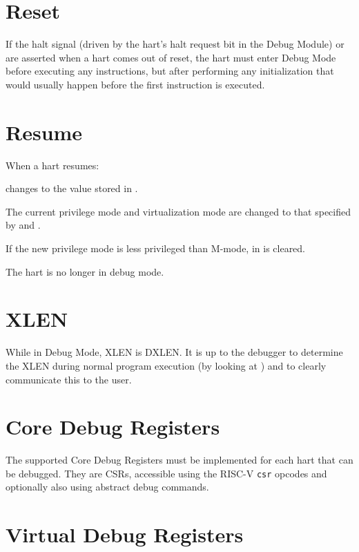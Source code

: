 \section{Reset}

If the halt signal (driven by the hart's halt request bit in the Debug Module)
or \Fresethaltreq are asserted when a hart comes out of reset, the hart must
enter Debug Mode before executing any instructions, but after performing any
initialization that would usually happen before the first instruction is
executed.

\section{Resume}

\begin{steps}{When a hart resumes:}
    \item \Rpc changes to the value stored in \RcsrDpc.
    \item The current privilege mode and virtualization mode are changed to that specified by
        \FcsrDcsrPrv and \FcsrDcsrV.
    \item If the new privilege mode is less privileged than M-mode,
        \FcsrMcontrolMprv in \Rmstatus is cleared.
    \item The hart is no longer in debug mode.
\end{steps}

\section{XLEN}

While in Debug Mode, XLEN is DXLEN. It is up to the debugger to determine the
XLEN during normal program execution (by looking at \Rmisa) and to clearly
communicate this to the user.

\section{Core Debug Registers} \label{debreg}

The supported Core Debug Registers must be implemented for each hart that can
be debugged. They are CSRs, accessible using the RISC-V {\tt csr} opcodes and
optionally also using abstract debug commands.



\section{Virtual Debug Registers} \label{virtreg}


